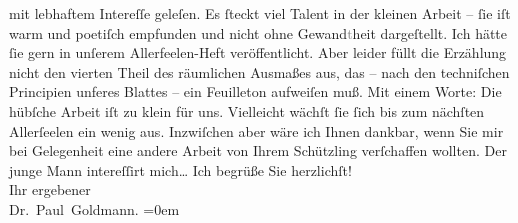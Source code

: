 \begin{ledgroupsized}[t]{13cm}
                  \label{K_L02644-2v}\label{K_L02644-2h} mit lebhaftem
               Intereſſe geleſen. Es ſteckt viel Talent in der kleinen Arbeit – ſie\strikeout{\textcolor{gray}{×}} iſt warm und poetiſch empfunden und nicht ohne Gewand\textcolor{gray}{t}heit
               dargeſtellt. Ich hätte ſie gern in unſerem Allerfeelen-Heft veröffentlicht. Aber leider füllt die Erzählung nicht den vierten
               Theil des räumlichen Ausmaßes aus, das – nach den techniſchen Principien unferes {\pb}Blattes – ein Feuilleton
               aufweiſen muß. Mit einem Worte: Die hübſche Arbeit iſt zu klein für uns. Vielleicht wächſt ſie ſich bis
               zum nächſten Allerſeelen ein wenig aus. Inzwiſchen
               aber wäre ich Ihnen dankbar, wenn Sie mir bei Gelegenheit eine andere Arbeit von
               Ihrem Schützling verſchaffen wollten. Der junge Mann intereſſirt mich{\dots}\pend
           \pstart
           Ich begrüße Sie herzlichſt! {\\[\baselineskip]}Ihr ergebener {\\[\baselineskip]}\spacefill\mbox{Dr. Paul Goldmann.}\pend
           \leftskip=0em{}          \endnumbering{}\end{ledgroupsized}  \newcommand{\dateiname}{L02644}\newcommand{\titel}{Paul Goldmann an Arthur Schnitzler, 21. 10. 1889}\newcommand{\editorInnen}{Martin Anton Müller und Laura Untner}
            \footnotesize
\begin{ledgroupsized}[t]{11.5cm}
\end{ledgroupsized}
         
      